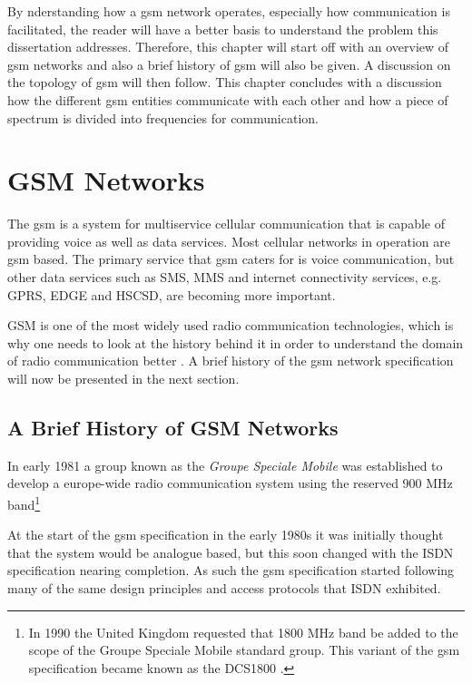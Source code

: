 By nderstanding how a \gls{gsm} network operates, especially how communication is facilitated, the reader will have a better basis to understand the problem this dissertation addresses. Therefore, this chapter will start off with an overview of \gls{gsm} networks and also a brief history of \gls{gsm} will also be given. A discussion on the topology of \gls{gsm} will then follow. This chapter concludes with a discussion how the different \gls{gsm} entities communicate with each other and how a piece of spectrum is divided into frequencies for communication.

\section{GSM Networks}
The \gls{gsm} is a system for multiservice cellular communication that is capable of providing voice as well as data services\cite{GSMArchitectureProtocolsServices,wirelesstelcoMullet}. Most cellular networks in operation are \gls{gsm} based\cite{Karen2004,wirelesstelcoMullet}. The primary service that \gls{gsm} caters for is voice communication, but other data services such as \gls{SMS}, \gls{MMS} and internet connectivity services, e.g. \gls{GPRS}, \gls{EDGE} and \gls{HSCSD}, are becoming more important\cite{GSMArchitectureProtocolsServices,Eisenblatter}.

GSM is one of the most widely used radio communication technologies, which is why one needs to look at the history behind it in order to understand the domain of radio communication better \cite{GSMArchitectureProtocolsServices}. A brief history of the \gls{gsm} network specification will now be presented in the next section.

\subsection{A Brief History of GSM Networks}
\label{sec:gsmhistory}
In early 1981 a group known as the \emph{Groupe Speciale Mobile} was established to develop a europe-wide radio communication system using the reserved 900 MHz band\footnote{In 1990 the United Kingdom requested that 1800 MHz band be added to the scope of the Groupe Speciale Mobile standard group. This variant of the \gls{gsm} specification became known as the \gls{DCS1800} \cite{GSM92,Karen2004}.}

At the start of the \gls{gsm} specification in the early 1980s it was initially thought that the system would be analogue based, but this soon changed with the \gls{ISDN} specification nearing completion\cite{GSM92}. As such the \gls{gsm} specification started following many of the same design principles and access protocols that \gls{ISDN} exhibited\cite{GSM92}.

